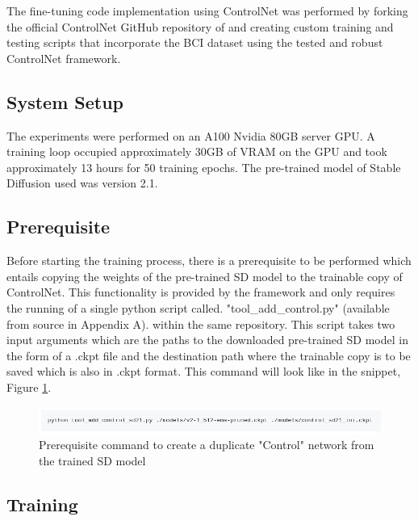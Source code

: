 The fine-tuning code implementation using ControlNet was performed by forking the official ControlNet GitHub repository of \parencite{Zhang2023AddingModels} and creating custom training and testing scripts that incorporate the BCI dataset using the tested and robust ControlNet framework.

\subsection{System Setup}

The experiments were performed on an A100 Nvidia 80GB server GPU. A training loop occupied approximately 30GB of VRAM on the GPU and took approximately 13 hours for 50 training epochs. The pre-trained model of Stable Diffusion used was version 2.1.

\subsection{Prerequisite}

Before starting the training process, there is a prerequisite to be performed which entails copying the weights of the pre-trained SD model to the trainable copy of ControlNet. This functionality is provided by the framework and only requires the running of  a single python script called. "tool\_add\_control.py" (available from source in Appendix A). within the same repository. This script takes two input arguments which are the paths to the downloaded pre-trained SD model in the form of a .ckpt file and the destination path where the trainable copy is to be saved which is also in .ckpt format. This command will look like in the snippet, Figure \ref{fig:copy-sd-control}.
\begin{figure}[h]
    \centering
    \includegraphics[width=1\linewidth]{4_ResearchMethodology/figures/ckpt_copy.png}
    \caption[Prerequisite command to copy weights]{Prerequisite command to create a duplicate "Control" network from the trained SD model \parencite[GitHub: ControlNet/docs/train.md]{Zhang2023AddingModels}}
    \label{fig:copy-sd-control}
\end{figure}

\subsection{Training}

